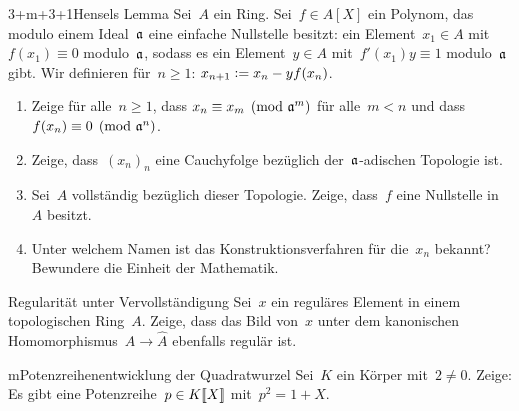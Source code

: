 \documentclass{uebblatt}
\begin{document}
\begin{aufgabe}{3+m+3+1}{Hensels Lemma}
Sei~$A$ ein Ring. Sei~$f \in A[X]$ ein
Polynom, das modulo einem Ideal~$\mathfrak{a}$ eine einfache Nullstelle besitzt: ein Element~$x_1
\in A$ mit~$f(x_1) \equiv 0$ modulo~$\mathfrak{a}$, sodass es ein Element~$y \in A$
mit~$f'(x_1) y \equiv 1$ modulo~$\mathfrak{a}$ gibt.
Wir definieren für~$n \geq 1$: $x_{n+1} \vcentcolon= x_n - y f(x_n)$.
\begin{enumerate}
\item Zeige für alle~$n \geq 1$, dass $x_n \equiv x_m \pmod{\mathfrak{a}^m}$ für
alle~$m < n$ und dass~$f(x_n) \equiv 0 \pmod{\mathfrak{a}^n}$.
\item Zeige, dass~$(x_n)_n$ eine Cauchyfolge bezüglich der~$\mathfrak{a}$-adischen
Topologie ist.
\item Sei~$A$ vollständig bezüglich dieser Topologie. Zeige,
dass~$f$ eine Nullstelle in~$A$ besitzt.
\item Unter welchem Namen ist das Konstruktionsverfahren für die~$x_n$ bekannt?
Bewundere die Einheit der Mathematik.
\end{enumerate}
\end{aufgabe}

\begin{aufgabe}{2}{Regularität unter Vervollständigung}
Sei~$x$ ein reguläres Element in einem topologischen Ring~$A$. Zeige, dass das
Bild von~$x$ unter dem kanonischen Homomorphismus~$A \to \hat A$ ebenfalls regulär ist.
\end{aufgabe}

\begin{aufgabe}{m}{Potenzreihenentwicklung der Quadratwurzel}
Sei~$K$ ein Körper mit~$2 \neq 0$. Zeige: Es gibt eine Potenzreihe~$p \in
{K}\llbracket{X}\rrbracket$ mit~$p^2 = 1 + X$.
\end{aufgabe}
\end{document}
